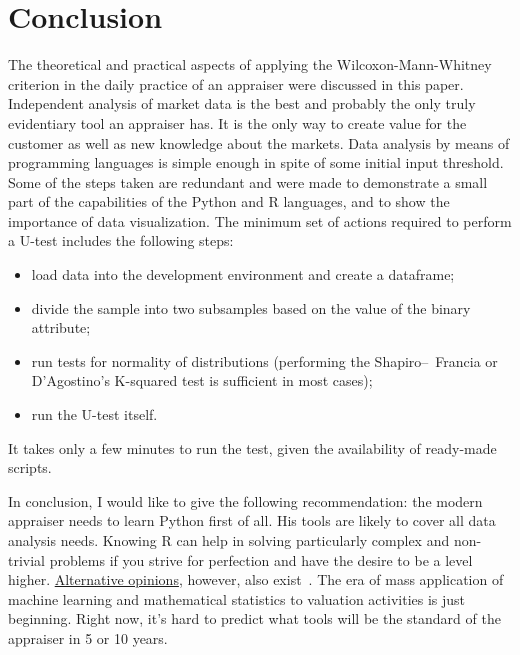 \documentclass[]{scrreprt}
\begin{document}
\chapter{Conclusion}
The theoretical and practical aspects of applying the Wilcoxon-Mann-Whitney criterion in the daily practice of an appraiser were discussed in this paper. Independent analysis of market data is the best and probably the only truly evidentiary tool an appraiser has. It is the only way to create value for the customer as well as new knowledge about the markets. Data analysis by means of programming languages is simple enough in spite of some initial input threshold. Some of the steps taken are redundant and were made to demonstrate a small part of the capabilities of the Python and R languages, and to show the importance of data visualization. The minimum set of actions required to perform a U-test includes the following steps:
\begin{itemize}
	\item load data into the development environment and create a dataframe;
	\item divide the sample into two subsamples based on the value of the binary attribute;
	\item run tests for normality of distributions (performing the Shapiro--~Francia or D'Agostino's K-squared test is sufficient in most cases);
	\item run the U-test itself.
\end{itemize}
It takes only a few minutes to run the test, given the availability of ready-made scripts.

In conclusion, I would like to give the following recommendation: the modern appraiser needs to learn Python first of all. His tools are likely to cover all data analysis needs. Knowing R can help in solving particularly complex and non-trivial problems if you strive for perfection and have the desire to be a level higher. \href{https://habr.com/ru/post/670250/}{Alternative opinions}, however, also exist~\cite{Habr:Python-or-R}. The era of mass application of machine learning and mathematical statistics to valuation activities is just beginning. Right now, it's hard to predict what tools will be the standard of the appraiser in 5 or 10 years.
%
\clearpage
%
\nocite{Essential-Statistical-Inference}
\nocite{AUC-optimization}
\nocite{Mann-Whitney-1947}
\nocite{Optimizing-classifier-performance}
\nocite{ROC-R-1}
\nocite{ROC-AUC-1}
\nocite{ROC-AUC-meets-U-R-1}

\printbibliography
\end{document}
